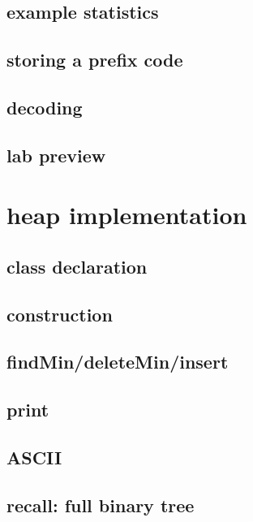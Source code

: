 \subsection{example statistics}

\subsection{storing a prefix code}

\subsection{decoding}

\subsection{lab preview}

\section{heap implementation}

\subsection{class declaration}

\subsection{construction}

\subsection{findMin/deleteMin/insert}

\subsection{print}



\subsection{ASCII}

\subsection{recall: full binary tree}


